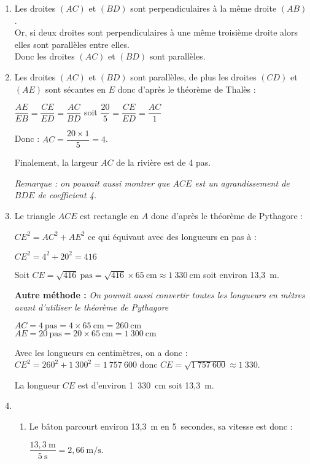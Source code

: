 
\medskip


\begin{enumerate}[itemsep=1em]
\item Les droites $(AC)$ et $(BD)$ sont perpendiculaires à la même droite $(AB)$.\\
Or, si deux droites sont perpendiculaires à une même troisième droite alors elles sont parallèles entre elles.\\
Donc les droites $(AC)$ et $(BD)$ sont parallèles.
\item Les droites $(AC)$ et $(BD)$ sont parallèles, de plus les droites $(CD)$ et $(AE)$ sont sécantes en $E$ donc d'après le théorème de Thalès : 

\medskip
$\dfrac{AE}{EB}=\dfrac{CE}{ED}=\dfrac{AC}{BD}$ soit $\dfrac{20}{5}=\dfrac{CE}{ED}=\dfrac{AC}{1}$

\medskip
Donc : $AC=\dfrac{20\times1}{5}=4$.

\medskip
Finalement, la largeur $AC$ de la rivière est de 4 pas.

\medskip
\textit{Remarque : on pouvait aussi montrer que $ACE$ est un agrandissement de $BDE$ de coefficient 4.}

\item Le triangle $ACE$ est rectangle en $A$ donc d'après le théorème de Pythagore :

\medskip
$CE^2=AC^2+AE^2$ ce qui équivaut avec des longueurs en pas à  : 

$CE^2=4^2+20^2=416$ 

\medskip
Soit $CE=\sqrt{416}~\text{pas}=\sqrt{416}\times65~\text{cm}\approx{1~330~\text{cm}}$ soit environ 13,3~m.

\bigskip
\textbf{Autre méthode :}
\textit{On pouvait aussi convertir toutes les longueurs en mètres avant d'utiliser le théorème de Pythagore}

$AC = 4~\text{pas} = 4 \times 65~\text{cm}=260~\text{cm}$\\
$AE = 20~\text{pas} = 20 \times 65~\text{cm}=1~300~\text{cm}$

Avec les longueurs en centimètres, on a donc : 
$CE^2=260^2+1~300^2=1~757~600$ donc $CE=\sqrt{1~757~600}\approx{1~330}$.

La longueur $CE$ est d'environ 1~330~cm soit 13,3~m.
\item 
    \begin{enumerate}
        \item Le bâton parcourt environ 13,3~m en 5~secondes, sa vitesse est donc : 
        
        \medskip
        $\dfrac{13,3~\text{m}}{5~\text{s}}=2,66~\text{m/s}$.
        

\end{enumerate}
\end{enumerate}
